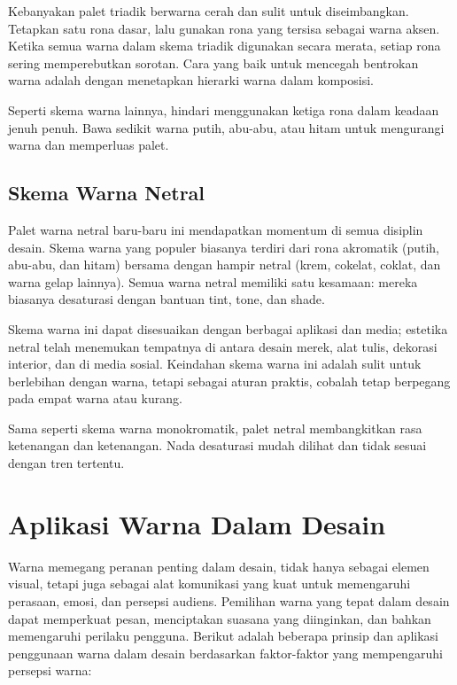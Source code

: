 \documentclass[a4paper]{article}
\begin{document}
Kebanyakan palet triadik berwarna cerah dan sulit untuk diseimbangkan. Tetapkan satu rona dasar, lalu gunakan rona yang tersisa sebagai warna aksen. Ketika semua warna dalam skema triadik digunakan secara merata, setiap rona sering memperebutkan sorotan. Cara yang baik untuk mencegah bentrokan warna adalah dengan menetapkan hierarki warna dalam komposisi.

Seperti skema warna lainnya, hindari menggunakan ketiga rona dalam keadaan jenuh penuh. Bawa sedikit warna putih, abu-abu, atau hitam untuk mengurangi warna dan memperluas palet.

\subsection{Skema Warna Netral}
Palet warna netral baru-baru ini mendapatkan momentum di semua disiplin desain. Skema warna yang populer biasanya terdiri dari rona akromatik (putih, abu-abu, dan hitam) bersama dengan hampir netral (krem, cokelat, coklat, dan warna gelap lainnya). Semua warna netral memiliki satu kesamaan: mereka biasanya desaturasi dengan bantuan tint, tone, dan shade.

Skema warna ini dapat disesuaikan dengan berbagai aplikasi dan media; estetika netral telah menemukan tempatnya di antara desain merek, alat tulis, dekorasi interior, dan di media sosial. Keindahan skema warna ini adalah sulit untuk berlebihan dengan warna, tetapi sebagai aturan praktis, cobalah tetap berpegang pada empat warna atau kurang.

Sama seperti skema warna monokromatik, palet netral membangkitkan rasa ketenangan dan ketenangan. Nada desaturasi mudah dilihat dan tidak sesuai dengan tren tertentu.

\section{Aplikasi Warna Dalam Desain}
Warna memegang peranan penting dalam desain, tidak hanya sebagai elemen visual, tetapi juga sebagai alat komunikasi yang kuat untuk memengaruhi perasaan, emosi, dan persepsi audiens. Pemilihan warna yang tepat dalam desain dapat memperkuat pesan, menciptakan suasana yang diinginkan, dan bahkan memengaruhi perilaku pengguna. Berikut adalah beberapa prinsip dan aplikasi penggunaan warna dalam desain berdasarkan faktor-faktor yang mempengaruhi persepsi warna:
\end{document}
